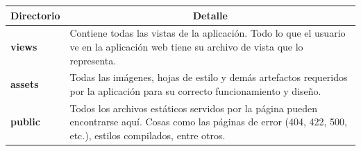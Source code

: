 \begin{center}
  \begin{tabular}{ | l | p{12.5cm} |}
    \hline
    \multicolumn{1}{|c|}{\textbf{Directorio}} & \multicolumn{1}{|c|}{\textbf{Detalle}} \\
    \hline
    
    {\textbf{views}} & Contiene todas las vistas de la aplicación. Todo lo que el usuario ve en la aplicación web tiene su archivo de vista que lo representa. \\ \hline
    
    {\textbf{assets}} & Todas las imágenes, hojas de estilo y demás artefactos requeridos por la aplicación para su correcto funcionamiento y diseño. \\ \hline
    
    {\textbf{public}} & Todos los archivos estáticos servidos por la página pueden encontrarse aquí. Cosas como las páginas de error (404, 422, 500, etc.), estilos compilados, entre otros.\\ \hline
  \end{tabular}
\end{center}
